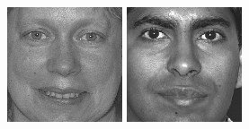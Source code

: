 \begin{figure}[ht]
\begin{center}
  \includegraphics[width=\columnwidth/10]{ch5/figures/feret21.jpg}
  \includegraphics[width=\columnwidth/10]{ch5/figures/feret22.jpg}

\end{center}
\end{figure}

